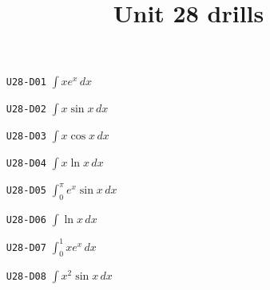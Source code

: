 \title{Unit 28 drills}\maketitle\begin{enumerate}
  \item[\texttt{U28-D01}] $\displaystyle \int x e^{x}\,dx$
  \item[\texttt{U28-D02}] $\displaystyle \int x\sin x\,dx$
  \item[\texttt{U28-D03}] $\displaystyle \int x\cos x\,dx$
  \item[\texttt{U28-D04}] $\displaystyle \int x\ln x\,dx$
  \item[\texttt{U28-D05}] $\displaystyle \int_{0}^{\pi}e^{x}\sin x\,dx$
  \item[\texttt{U28-D06}] $\displaystyle \int\ln x\,dx$
  \item[\texttt{U28-D07}] $\displaystyle \int_{0}^{1}x e^{x}\,dx$
  \item[\texttt{U28-D08}] $\displaystyle \int x^{2}\sin x\,dx$
\end{enumerate}
